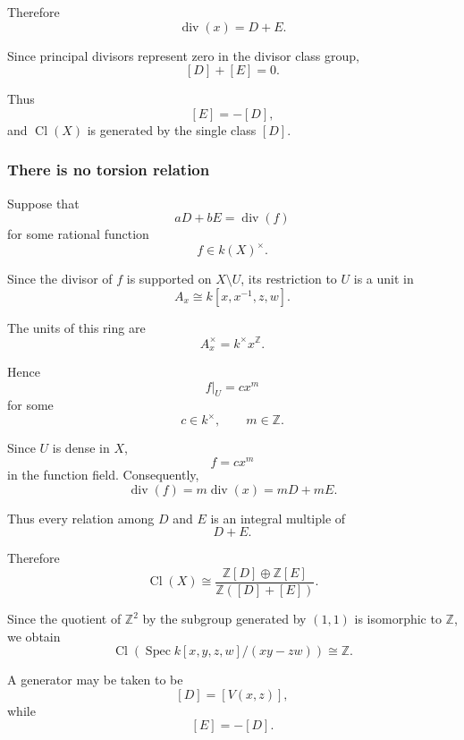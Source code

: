 Therefore
\[
\operatorname{div}(x)=D+E.
\]

Since principal divisors represent zero in the divisor class group,
\[
[D]+[E]=0.
\]

Thus
\[
[E]=-[D],
\]
and \(\operatorname{Cl}(X)\) is generated by the single class \([D]\).

\subsubsection{There is no torsion relation}

Suppose that
\[
aD+bE=\operatorname{div}(f)
\]
for some rational function
\[
f\in k(X)^\times.
\]

Since the divisor of \(f\) is supported on \(X\setminus U\), its restriction to \(U\) is a unit in
\[
A_x\cong k[x,x^{-1},z,w].
\]

The units of this ring are
\[
A_x^\times=k^\times x^{\mathbb{Z}}.
\]

Hence
\[
f|_U=cx^m
\]
for some
\[
c\in k^\times,
\qquad
m\in \mathbb{Z}.
\]

Since \(U\) is dense in \(X\),
\[
f=cx^m
\]
in the function field. Consequently,
\[
\operatorname{div}(f)
=
m\operatorname{div}(x)
=
mD+mE.
\]

Thus every relation among \(D\) and \(E\) is an integral multiple of
\[
D+E.
\]

Therefore
\[
\operatorname{Cl}(X)
\cong
\frac{\mathbb{Z}[D]\oplus \mathbb{Z}[E]}
{\mathbb{Z}([D]+[E])}.
\]

Since the quotient of \(\mathbb{Z}^2\) by the subgroup generated by \((1,1)\) is isomorphic to \(\mathbb{Z}\), we obtain
\[
\boxed{
	\operatorname{Cl}\!\left(\operatorname{Spec} k[x,y,z,w]/(xy-zw)\right)
	\cong
	\mathbb{Z}.
}
\]

A generator may be taken to be
\[
[D]=[V(x,z)],
\]
while
\[
[E]=-[D].
\]

